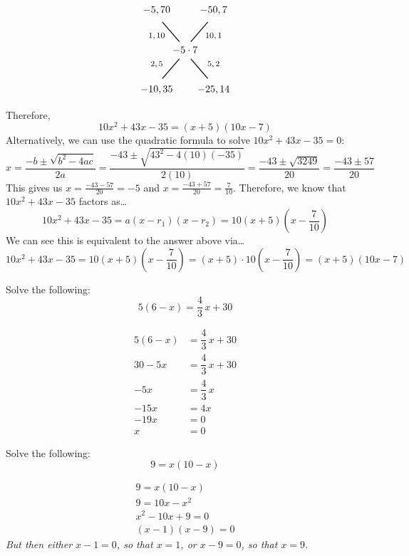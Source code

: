 \documentclass[12pt,letterpaper]{exam}
\begin{document}
\begin{questions}
{\[\begin{tikzpicture}
	\tikzset{shift={(7,0)}}
	
	\node at (0,0) {$-5 \cdot 7$};

	\node at (-1,0.5) {\footnotesize$1, 10$};
	\draw[line width=0.03cm,label={1}] (-0.2,0.3) -- (-0.8,1);
	\node at (-1,1.4) {$-5, 70$};

	\node at (1,0.5) {\footnotesize$10, 1$};
	\draw[line width=0.03cm,label={1}] (0.2,0.3) -- (0.8,1);
	\node at (1,1.4) {$-50, 7$};	
	
	\node at (-1,-0.5) {\footnotesize$2, 5$};
	\draw[line width=0.03cm,label={1}] (-0.2,-0.3) -- (-0.8,-1);
	\node at (-1,-1.4) {$-10, 35$};

	\node at (1,-0.5) {\footnotesize$5, 2$};
	\draw[line width=0.03cm,label={1}] (0.2,-0.3) -- (0.8,-1);
	\node at (1,-1.4) {$-25, 14$};			
	\end{tikzpicture}
	\]

Therefore, 
	\[
	10x^2 + 43x - 35= (x + 5)(10x - 7)
	\] \pspace
Alternatively, we can use the quadratic formula to solve $10x^2 + 43x - 35= 0$:
	\[
	x= \dfrac{-b \pm \sqrt{b^2 - 4ac}}{2a}= \dfrac{-43 \pm \sqrt{43^2 - 4(10)(-35)}}{2(10)}= \dfrac{-43 \pm \sqrt{3249}}{20}= \dfrac{-43 \pm 57}{20}
	\]
This gives us $x= \frac{-43 - 57}{20}= -5$ and $x= \frac{-43 + 57}{20}= \frac{7}{10}$. Therefore, we know that $10x^2 + 43x - 35$ factors as\dots
	\[
	10x^2 + 43x - 35= a(x - r_1)(x - r_2)= 10(x + 5) \left( x - \frac{7}{10} \right)
	\]
We can see this is equivalent to the answer above via\dots
	\[
	10x^2 + 43x - 35= 10(x + 5) \left( x - \frac{7}{10} \right)= (x + 5) \cdot 10 \left( x - \frac{7}{10} \right)= (x + 5)(10x - 7)
	\]
}



\newpage
\question[10] Solve the following:
	\[
	5(6 - x)= \dfrac{4}{3}\,x + 30
	\] \pspace

	\[
	\begin{aligned}
	5(6 - x)&= \dfrac{4}{3}\,x + 30 \\[0.3cm]
	30 - 5x&= \dfrac{4}{3}\,x + 30 \\[0.3cm]
	-5x&= \dfrac{4}{3}\,x \\[0.3cm]
	-15x&= 4x \\[0.3cm]
	-19x&= 0 \\[0.3cm]
	x&= 0
	\end{aligned}
	\]



\newpage
\question[10] Solve the following:
	\[
	9= x(10 - x)
	\] \pspace

{\itshape
	\[
	\begin{aligned}
	9= x(10 - x) \\[0.3cm]
	9= 10x - x^2 \\[0.3cm]
	x^2 - 10x + 9= 0 \\[0.3cm]
	(x - 1)(x - 9)= 0
	\end{aligned}
	\] \pspace
But then either $x - 1=0$, so that $x= 1$, or $x - 9=0$, so that $x= 9$.}




\end{questions}
\end{document}
